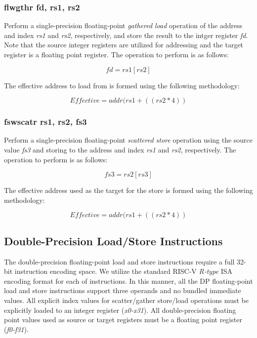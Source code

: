 \documentclass{article}
\begin{document}
\subsubsection{flwgthr fd, rs1, rs2}

Perform a single-precision floating-point \emph{gathered load} operation of the
address and index \emph{rs1} and \emph{rs2}, respectively, and store the result
to the intger register \emph{fd}.  Note that the source integer registers are
utilized for addressing and the target register is a floating point register.
The operation to perform is as follows:

\begin{equation}
fd = rs1[rs2]
\end{equation}

The effective address to load
from is formed using the following methodology:

\begin{equation}
Effective = addr(rs1 + ((rs2 * 4))
\end{equation}


\subsubsection{fswscatr rs1, rs2, fs3}

Perform a single-precision floating-point \emph{scattered store} operation 
using the source value \emph{fs3} and storing to the address and index
\emph{rs1} and \emph{rs2}, respectively.  The operation to
perform is as follows: 

\begin{equation}
fs3 = rs2[rs3]
\end{equation}

The effective address used as the target
for the store is formed using the following methodology:

\begin{equation}
Effective = addr(rs1 + ((rs2 * 4))
\end{equation}


\subsection{Double-Precision Load/Store Instructions}

The double-precision floating-point load and store instructions
require a full 32-bit instruction encoding space.  We utilize the 
standard RISC-V \emph{R-type} ISA encoding format for each of instructions.  In
this manner, all the DP floating-point load and store instructions support
three operands and no bundled immediate values.  All explicit index
values for scatter/gather store/load operations must be explicitly
loaded to an integer register (\emph{x0-x31}).  All double-precision
floating point values used as source or target registers must be a floating
point register (\emph{f0-f31}).
\end{document}

